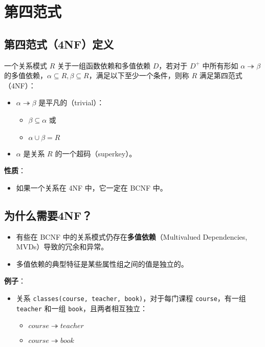 \section{第四范式}

\subsection{第四范式（4NF）定义}

一个关系模式 $R$ 关于一组函数依赖和多值依赖 $D$，若对于 $D^+$ 中所有形如 $\alpha \twoheadrightarrow \beta$ 的多值依赖，$\alpha \subseteq R, \beta \subseteq R$，满足以下至少一个条件，则称 $R$ 满足第四范式（4NF）：

\begin{itemize}
    \item $\alpha \twoheadrightarrow \beta$ 是平凡的（trivial）：
    \begin{itemize}
        \item $\beta \subseteq \alpha$ 或
        \item $\alpha \cup \beta = R$
    \end{itemize}
    \item $\alpha$ 是关系 $R$ 的一个超码（superkey）。
\end{itemize}

\textbf{性质}：

\begin{itemize}
    \item 如果一个关系在 4NF 中，它一定在 BCNF 中。
\end{itemize}

\subsection{为什么需要4NF？}

\begin{itemize}
    \item 有些在 BCNF 中的关系模式仍存在\textbf{多值依赖}（Multivalued Dependencies, MVDs）导致的冗余和异常。
    \item 多值依赖的典型特征是某些属性组之间的值是独立的。
\end{itemize}

\textbf{例子}：

\begin{itemize}
    \item 关系 \texttt{classes(course, teacher, book)}，对于每门课程 \texttt{course}，有一组 \texttt{teacher} 和一组 \texttt{book}，且两者相互独立：
    \begin{itemize}
        \item $course \twoheadrightarrow teacher$
        \item $course \twoheadrightarrow book$
    \end{itemize}
\end{itemize}

